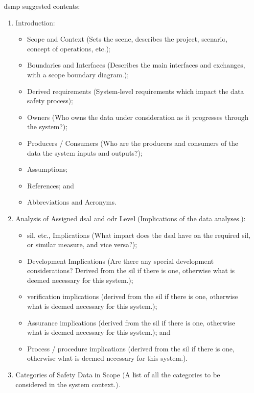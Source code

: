 \Gls{dsmp} suggested contents:
\begin{enumerate}
  \item Introduction:
  \begin{itemize}
    \item Scope and Context (Sets the scene, describes the project, scenario, concept of operations, etc.);
    \item Boundaries and Interfaces (Describes the main interfaces and exchanges, with a scope boundary diagram.);
    \item
      Derived requirements (System-level requirements which impact the data safety process);
    \item {}Owners (Who owns the data under consideration as it progresses through the system?);
    \item Producers / Consumers (Who are the producers and consumers of the data the system inputs and outputs?);
    \item Assumptions;
    \item References; and
    \item Abbreviations and Acronyms.
  \end{itemize}
  \item Analysis of Assigned \gls{dsal} and \gls{odr} Level (Implications of the data analyses.):
  \begin{itemize}
    \item \Gls{sil}, etc., Implications (What impact does the \gls{dsal} have on the required \gls{sil}, or similar measure, and vice versa?);
    \item Development Implications (Are there any special development considerations? Derived from the \gls{sil} if there is one, otherwise what is deemed necessary for this system.);
    \item \Gls{verification} implications (derived from the \gls{sil} if there is one, otherwise what is deemed necessary for this system.);
    \item Assurance implications (derived from the \gls{sil} if there is one, otherwise what is deemed necessary for this system.); and
    \item Process / procedure implications (derived from the \gls{sil} if there is one, otherwise what is deemed necessary for this system.).
  \end{itemize}
\item
  Categories
  of Safety Data in Scope (A list of all the categories to be considered in the system context.).

\end{enumerate}
